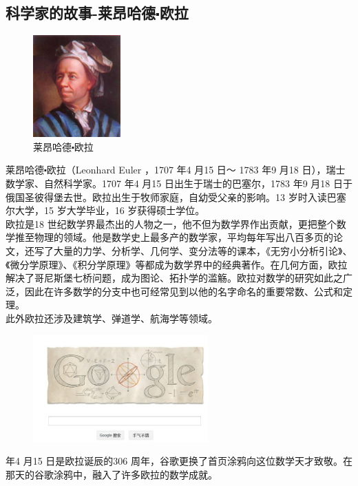\documentclass[11pt,a4paper,openany]{book}
\begin{document}
\subsection{科学家的故事-莱昂哈德$\centerdot$欧拉}
\begin{figure}[h]
  \centering
  \includegraphics[width=0.3\textwidth]{oula.jpg}
  \caption*{莱昂哈德$\centerdot$欧拉}
\end{figure}
\indent 莱昂哈德$\centerdot$欧拉（Leonhard Euler ，1707 年4 月15 日～ 1783 年9 月18 日），瑞士数学家、自然科学家。1707 年4 月15 日出生于瑞士的巴塞尔，1783 年9 月18 日于俄国圣彼得堡去世。欧拉出生于牧师家庭，自幼受父亲的影响。13 岁时入读巴塞尔大学，15 岁大学毕业，16 岁获得硕士学位。\\
\indent 欧拉是18 世纪数学界最杰出的人物之一，他不但为数学界作出贡献，更把整个数学推至物理的领域。他是数学史上最多产的数学家，平均每年写出八百多页的论文，还写了大量的力学、分析学、几何学、变分法等的课本，《无穷小分析引论》、《微分学原理》、《积分学原理》等都成为数学界中的经典著作。在几何方面，欧拉解决了哥尼斯堡七桥问题，成为图论、拓扑学的滥觞。欧拉对数学的研究如此之广泛，因此在许多数学的分支中也可经常见到以他的名字命名的重要常数、公式和定理。\\
\indent 此外欧拉还涉及建筑学、弹道学、航海学等领域。\\
\begin{figure}[h]
  \centering
  \includegraphics[width=0.6\textwidth]{oula1.png}
\end{figure}
 年4 月15 日是欧拉诞辰的306 周年，谷歌更换了首页涂鸦向这位数学天才致敬。在那天的谷歌涂鸦中，融入了许多欧拉的数学成就。
\end{document}
